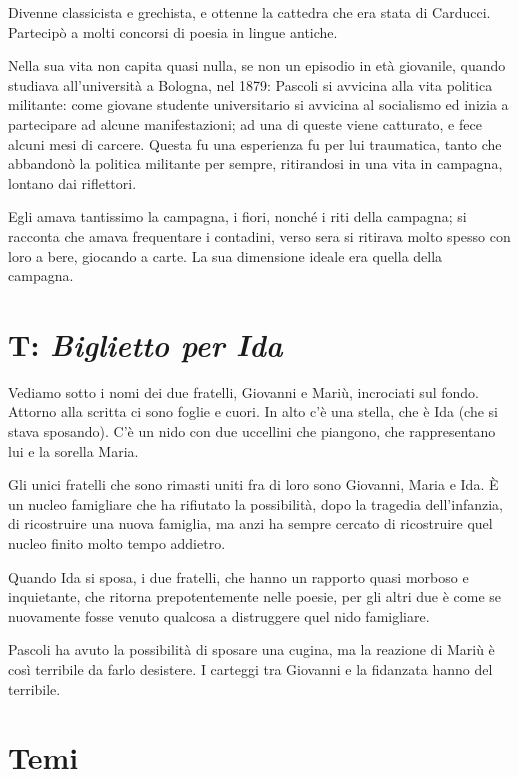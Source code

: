 \documentclass[a4paper, twoside, titlepage]{book}
\begin{document}
Divenne classicista e grechista, e ottenne la cattedra che era stata di Carducci. Partecipò a molti concorsi di poesia in lingue antiche.

Nella sua vita non capita quasi nulla, se non un episodio in età giovanile, quando studiava all'università a Bologna, nel 1879: Pascoli si avvicina alla vita politica militante: come giovane studente universitario si avvicina al socialismo ed inizia a partecipare ad alcune manifestazioni; ad una di queste viene catturato, e fece alcuni mesi di carcere. Questa fu una esperienza fu per lui traumatica, tanto che abbandonò la politica militante per sempre, ritirandosi in una vita in campagna, lontano dai riflettori.

Egli amava tantissimo la campagna, i fiori, nonché i riti della campagna; si racconta che amava frequentare i contadini, verso sera si ritirava molto spesso con loro a bere, giocando a carte. La sua dimensione ideale era quella della campagna.


\section{T: \textit{Biglietto per Ida}}

Vediamo sotto i nomi dei due fratelli, Giovanni e Mariù, incrociati sul fondo.
Attorno alla scritta ci sono foglie e cuori.
In alto c'è una stella, che è Ida (che si stava sposando).
C'è un nido con due uccellini che piangono, che rappresentano lui e la sorella Maria.

Gli unici fratelli che sono rimasti uniti fra di loro sono Giovanni, Maria e Ida.
È un nucleo famigliare che ha rifiutato la possibilità, dopo la tragedia dell'infanzia, di ricostruire una nuova famiglia, ma anzi ha sempre cercato di ricostruire quel nucleo finito molto tempo addietro.

Quando Ida si sposa, i due fratelli, che hanno un rapporto quasi morboso e inquietante, che ritorna prepotentemente nelle poesie, per gli altri due è come se nuovamente fosse venuto qualcosa a distruggere quel nido famigliare.

Pascoli ha avuto la possibilità di sposare una cugina, ma la reazione di Mariù è così terribile da farlo desistere. I carteggi tra Giovanni e la fidanzata hanno del terribile.

\section{Temi}
\end{document}
